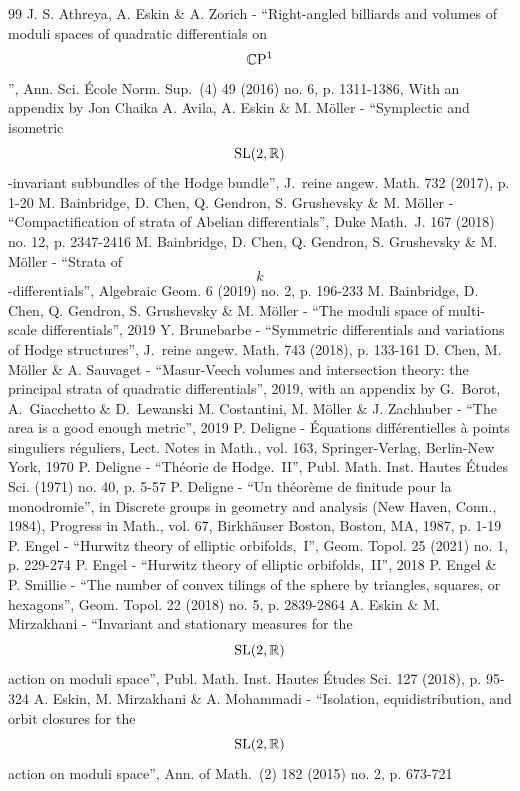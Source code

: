 \begin{thebibliography}{99}
 J. S. Athreya, A. Eskin \& A. Zorich - “Right-angled billiards and volumes of moduli spaces of quadratic differentials on $$\mathbb{C}\rm P^1$$”, Ann. Sci. École Norm. Sup. (4) 49 (2016) no. 6, p. 1311-1386, With an appendix by Jon Chaika
 A. Avila, A. Eskin \& M. Möller - “Symplectic and isometric $${\rm SL}(2,\mathbb{R})$$-invariant subbundles of the Hodge bundle”, J. reine angew. Math. 732 (2017), p. 1-20
 M. Bainbridge, D. Chen, Q. Gendron, S. Grushevsky \& M. Möller - “Compactification of strata of Abelian differentials”, Duke Math. J. 167 (2018) no. 12, p. 2347-2416
 M. Bainbridge, D. Chen, Q. Gendron, S. Grushevsky \& M. Möller - “Strata of $$k$$-differentials”, Algebraic Geom. 6 (2019) no. 2, p. 196-233
 M. Bainbridge, D. Chen, Q. Gendron, S. Grushevsky \& M. Möller - “The moduli space of multi-scale differentials”, 2019
 Y. Brunebarbe - “Symmetric differentials and variations of Hodge structures”, J. reine angew. Math. 743 (2018), p. 133-161
 D. Chen, M. Möller \& A. Sauvaget - “Masur-Veech volumes and intersection theory: the principal strata of quadratic differentials”, 2019, with an appendix by G. Borot, A. Giacchetto \& D. Lewanski
 M. Costantini, M. Möller \& J. Zachhuber - “The area is a good enough metric”, 2019
 P. Deligne - Équations différentielles à points singuliers réguliers, Lect. Notes in Math., vol. 163, Springer-Verlag, Berlin-New York, 1970
 P. Deligne - “Théorie de Hodge. II”, Publ. Math. Inst. Hautes Études Sci. (1971) no. 40, p. 5-57
 P. Deligne - “Un théorème de finitude pour la monodromie”, in Discrete groups in geometry and analysis (New Haven, Conn., 1984), Progress in Math., vol. 67, Birkhäuser Boston, Boston, MA, 1987, p. 1-19
 P. Engel - “Hurwitz theory of elliptic orbifolds, I”, Geom. Topol. 25 (2021) no. 1, p. 229-274
 P. Engel - “Hurwitz theory of elliptic orbifolds, II”, 2018
 P. Engel \& P. Smillie - “The number of convex tilings of the sphere by triangles, squares, or hexagons”, Geom. Topol. 22 (2018) no. 5, p. 2839-2864
 A. Eskin \& M. Mirzakhani - “Invariant and stationary measures for the $${\rm SL}(2,\mathbb{R})$$ action on moduli space”, Publ. Math. Inst. Hautes Études Sci. 127 (2018), p. 95-324
 A. Eskin, M. Mirzakhani \& A. Mohammadi - “Isolation, equidistribution, and orbit closures for the $${\rm SL}(2,\mathbb{R})$$ action on moduli space”, Ann. of Math. (2) 182 (2015) no. 2, p. 673-721

\end{thebibliography}
